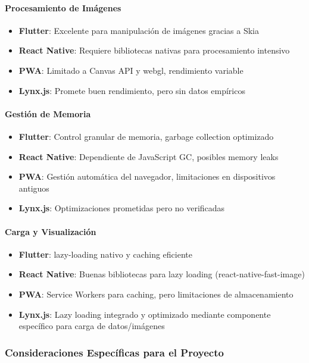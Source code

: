 \paragraph{Procesamiento de Imágenes}
\begin{itemize}
    \item \textbf{Flutter}: Excelente para manipulación de imágenes gracias a Skia
    \item \textbf{React Native}: Requiere bibliotecas nativas para procesamiento intensivo
    \item \textbf{PWA}: Limitado a Canvas API y \gls{webgl}, rendimiento variable
    \item \textbf{Lynx.js}: Promete buen rendimiento, pero sin datos empíricos
\end{itemize}

\paragraph{Gestión de Memoria}
\begin{itemize}
    \item \textbf{Flutter}: Control granular de memoria, garbage collection optimizado
    \item \textbf{React Native}: Dependiente de JavaScript GC, posibles memory leaks
    \item \textbf{PWA}: Gestión automática del navegador, limitaciones en dispositivos antiguos
    \item \textbf{Lynx.js}: Optimizaciones prometidas pero no verificadas
\end{itemize}

\paragraph{Carga y Visualización}
\begin{itemize}
    \item \textbf{Flutter}: \Gls{lazy-loading} nativo y caching eficiente
    \item \textbf{React Native}: Buenas bibliotecas para lazy loading (react-native-fast-image)
    \item \textbf{PWA}: Service Workers para caching, pero limitaciones de almacenamiento
    \item \textbf{Lynx.js}: Lazy loading integrado y optimizado mediante componente específico para carga de datos/imágenes
\end{itemize}

\subsubsection{Consideraciones Específicas para el Proyecto}

